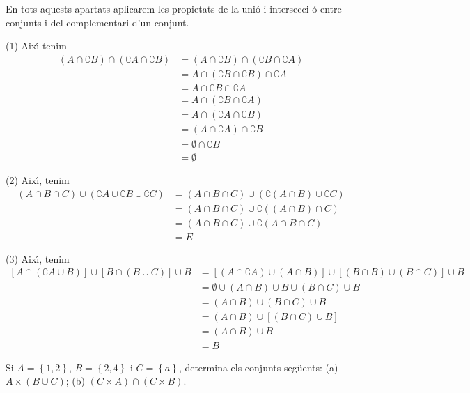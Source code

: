 \begin{solucio}
En tots aquests apartats aplicarem les propietats de la uni\'{o} i intersecci%
\'{o} entre conjunts i del complementari d'un conjunt.

(1) Aix\'{\i} tenim%
\begin{align*}
(A\cap \complement B)\cap (\complement A\cap \complement B)& =(A\cap
\complement B)\cap (\complement B\cap \complement A) \\
& =A\cap (\complement B\cap \complement B)\cap \complement A \\
& =A\cap \complement B\cap \complement A \\
& =A\cap (\complement B\cap \complement A) \\
& =A\cap (\complement A\cap \complement B) \\
& =(A\cap \complement A)\cap \complement B \\
& =\emptyset \cap \complement B \\
& =\emptyset
\end{align*}

(2) Aix\'{\i}, tenim%
\begin{align*}
(A\cap B\cap C)\cup (\complement A\cup \complement B\cup \complement C)&
=(A\cap B\cap C)\cup (\complement \left( A\cap B\right) \cup \complement C)
\\
& =(A\cap B\cap C)\cup \complement \left( (A\cap B)\cap C\right) \\
& =(A\cap B\cap C)\cup \complement \left( A\cap B\cap C\right) \\
& =E
\end{align*}

(3) Aix\'{\i}, tenim%
\begin{align*}
\left[ A\cap (\complement A\cup B)\right] \cup \left[ B\cap (B\cup C)\right]
\cup B& =\left[ (A\cap \complement A)\cup (A\cap B)\right] \cup \left[
(B\cap B)\cup (B\cap C)\right] \cup B \\
& =\emptyset \cup (A\cap B)\cup B\cup (B\cap C)\cup B \\
& =(A\cap B)\cup (B\cap C)\cup B \\
& =(A\cap B)\cup \left[ (B\cap C)\cup B\right] \\
& =(A\cap B)\cup B \\
& =B
\end{align*}
\end{solucio}

\begin{exer}
Si $A=\left\{ 1,2\right\} $, $B=\left\{ 2,4\right\} $ i $C=\left\{ a\right\}
$, determina els conjunts seg\"{u}ents: (a) $A\times (B\cup C)$; (b) $%
(C\times A)\cap (C\times B)$.
\end{exer}


